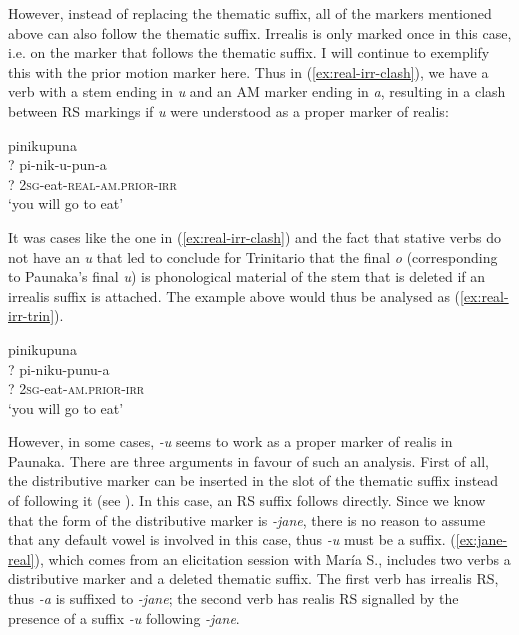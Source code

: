 However, instead of replacing the thematic suffix, all of the markers mentioned above can also follow the thematic suffix. Irrealis is only marked once in this case, i.e. on the marker that follows the thematic suffix. I will continue to exemplify this with the prior motion marker here. Thus in  (\ref{ex:real-irr-clash}), we have a verb with a stem ending in \textit{u} and an AM marker ending in \textit{a}, resulting in a clash between RS markings if \textit{u} were understood as a proper marker of realis:

\ea\label{ex:real-irr-clash}
\begingl 
\glpreamble pinikupuna\\
\gla ? pi-nik-u-pun-a\\ 
\glb ? 2\textsc{sg}-eat-\textsc{real}-\textsc{am.prior}-\textsc{irr}\\ 
\glft ‘you will go to eat’
\xe

It was cases like the one in (\ref{ex:real-irr-clash}) and the fact that stative verbs  do not have an \textit{u} that led \citet[227]{Rose2014} to conclude for Trinitario that the final \textit{o} (corresponding to Paunaka’s final \textit{u}) is phonological material of the stem that is deleted if an irrealis suffix is attached. The example above would thus be analysed as (\ref{ex:real-irr-trin}).

\ea\label{ex:real-irr-trin}
\begingl 
\glpreamble pinikupuna\\
\gla ? pi-niku-punu-a\\ 
\glb ? 2\textsc{sg}-eat-\textsc{am.prior}-\textsc{irr}\\ 
\glft ‘you will go to eat’
\xe
{}

However, in some cases, \textit{-u} seems to work as a proper marker of realis in Paunaka. There are three arguments in favour of such an analysis. First of all, the distributive marker can be inserted in the slot of the thematic suffix instead of following it (see ). In this case, an RS suffix follows directly. Since we know that the form of the distributive marker is \textit{-jane}, there is no reason to assume that any default vowel is involved in this case, thus \textit{-u} must be a suffix. (\ref{ex:jane-real}), which comes from an elicitation session with María S., includes two verbs a distributive marker and a deleted thematic suffix. The first verb has irrealis RS, thus \textit{-a} is suffixed to \textit{-jane}; the second verb has realis RS signalled by the presence of a suffix \textit{-u} following \textit{-jane}.

